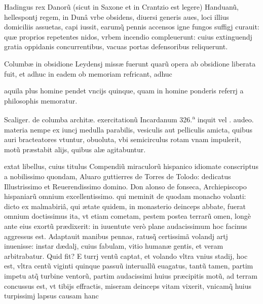 \documentclass[11pt,a4paper]{article}
\begin{document}
Hadingus rex Danorũ (sicut in Saxone et in Crantzio est legere) Handuanũ, hellespontj regem, in Dunâ vrbe obsidens, diuersi generis aues, loci illius domiciliis assuetas, capi iussit, earumq̃ pennis accensos igne fungos suffigj curauit: quæ proprios repetentes nidos, vrbem incendio compleuerunt: cuius extinguendj gratia oppidanis concurrentibus, vacuas portas defensoribus reliquerunt.

Columbæ in obsidione Leydensj missæ fuerunt quarũ opera \struck{\ill{}}  \struck{\ill{}}  ab obsidione liberata fuit, et adhuc in eadem  ob memoriam refricant, adhuc

aquila plus homine pendet vncijs quinque, quam in homine ponderis referrj a philosophis memoratur.


Scaliger. de columba architæ. exercitationũ Incardanum 326.\textsuperscript{a} inquit vel  . audeo. materia nempe ex iuncj medulla parabilis, vesiculis aut pelliculis amicta, quibus auri bracteatores vtuntur,  obuoluta, vbi semicirculus rotam vnam impulerit, motũ præstabit alijs, quibus alæ agitabuntur.

extat libellus, cuius titulus Compendiũ miraculorũ hispanico idiomate conscriptus a nobilissimo quondam, Aluaro guttierres de Torres de Tolodo: dedicatus Illustrissimo et Reuerendissimo domino. Don alonso de fonseca, Archiepiscopo hispaniarũ omnium excellentissimo. qui meminit de quodam monacho volanti: dicto  ex malmabiriâ, qui ætate quidem, in monasterio deinceps abbate, fuerat omnium doctissimus ita, vt etiam cometam, pestem postea terrarũ omen, longè ante eius exortũ prædixerit: in iuuentute verò plane audacissimum hoc facinus aggressus est. Adaptauit manibus pennas, ratusq̃ certissimã volandj artj inuenisse: instar dædalj, cuius fabulam, vitio humanæ gentis, et veram arbitrabatur. Quid fit? E turrj ventũ captat, et volando vltra vnius stadij, hoc est, vltra centũ viginti quinque passuũ interuallũ euagatus, tantũ tamen, partim impetu atq̃ turbine ventorũ, partim audacissimi huius præcipitis motũ, ad terram concussus est, vt tibijs effractis, miseram deinceps vitam vixerit, vnicamq̃ huius turpissimj lapsus causam hanc
\end{document}
